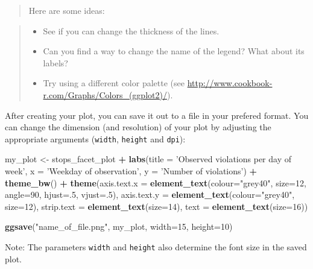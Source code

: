 \documentclass[]{book}
\newenvironment{Shaded}{\begin{snugshade}}{\end{snugshade}}
\newcommand{\DataTypeTok}[1]{\textcolor[rgb]{0.13,0.29,0.53}{#1}}
\newcommand{\DecValTok}[1]{\textcolor[rgb]{0.00,0.00,0.81}{#1}}
\newcommand{\KeywordTok}[1]{\textcolor[rgb]{0.13,0.29,0.53}{\textbf{#1}}}
\newcommand{\NormalTok}[1]{#1}
\newcommand{\OperatorTok}[1]{\textcolor[rgb]{0.81,0.36,0.00}{\textbf{#1}}}
\newcommand{\StringTok}[1]{\textcolor[rgb]{0.31,0.60,0.02}{#1}}
\providecommand{\tightlist}{%
  \setlength{\itemsep}{0pt}\setlength{\parskip}{0pt}}
\begin{document}
\begin{quote}
Here are some ideas:
\end{quote}

\begin{quote}
\begin{itemize}
\tightlist
\item
  See if you can change the thickness of the lines.
\item
  Can you find a way to change the name of the legend? What about its labels?
\item
  Try using a different color palette (see \url{http://www.cookbook-r.com/Graphs/Colors_(ggplot2)/}).
\end{itemize}
\end{quote}

After creating your plot, you can save it out to a file in your prefered format. You can change the dimension (and resolution) of your plot by adjusting the appropriate arguments (\texttt{width}, \texttt{height} and \texttt{dpi}):

\begin{Shaded}
\begin{Highlighting}[]
\NormalTok{my_plot <-}\StringTok{ }\NormalTok{stops_facet_plot }\OperatorTok{+}
\StringTok{  }\KeywordTok{labs}\NormalTok{(}\DataTypeTok{title =} \StringTok{'Observed violations per day of week'}\NormalTok{,}
         \DataTypeTok{x =} \StringTok{'Weekday of observation'}\NormalTok{,}
         \DataTypeTok{y =} \StringTok{'Number of violations'}\NormalTok{) }\OperatorTok{+}
\StringTok{  }\KeywordTok{theme_bw}\NormalTok{() }\OperatorTok{+}\StringTok{ }
\StringTok{  }\KeywordTok{theme}\NormalTok{(}\DataTypeTok{axis.text.x =} \KeywordTok{element_text}\NormalTok{(}\DataTypeTok{colour=}\StringTok{"grey40"}\NormalTok{, }\DataTypeTok{size=}\DecValTok{12}\NormalTok{, }\DataTypeTok{angle=}\DecValTok{90}\NormalTok{, }\DataTypeTok{hjust=}\NormalTok{.}\DecValTok{5}\NormalTok{, }\DataTypeTok{vjust=}\NormalTok{.}\DecValTok{5}\NormalTok{),}
        \DataTypeTok{axis.text.y =} \KeywordTok{element_text}\NormalTok{(}\DataTypeTok{colour=}\StringTok{"grey40"}\NormalTok{, }\DataTypeTok{size=}\DecValTok{12}\NormalTok{),}
        \DataTypeTok{strip.text =} \KeywordTok{element_text}\NormalTok{(}\DataTypeTok{size=}\DecValTok{14}\NormalTok{),}
        \DataTypeTok{text =} \KeywordTok{element_text}\NormalTok{(}\DataTypeTok{size=}\DecValTok{16}\NormalTok{))}

\KeywordTok{ggsave}\NormalTok{(}\StringTok{"name_of_file.png"}\NormalTok{, my_plot, }\DataTypeTok{width=}\DecValTok{15}\NormalTok{, }\DataTypeTok{height=}\DecValTok{10}\NormalTok{)}
\end{Highlighting}
\end{Shaded}

Note: The parameters \texttt{width} and \texttt{height} also determine the font size in the saved plot.


\end{document}
